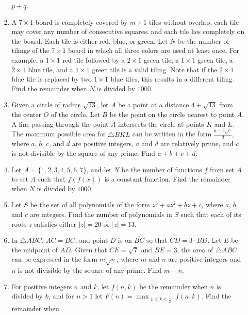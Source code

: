 \documentclass{article}
\begin{document}
\begin{enumerate}[label=\arabic*., itemsep=0.5em]
\(p+q\).\par \vspace{0.5em}\item A \(7\times 1\) board is completely covered by \(m\times 1\) tiles without overlap; each tile may cover any number of consecutive squares, and each tile lies completely on the board. Each tile is either red, blue, or green. Let \(N\) be the number of tilings of the \(7\times 1\) board in which all three colors are used at least once. For example, a \(1\times 1\) red tile followed by a \(2\times 1\) green tile, a \(1\times 1\) green tile, a \(2\times 1\) blue tile, and a \(1\times 1\) green tile is a valid tiling. Note that if the \(2\times 1\) blue tile is replaced by two \(1\times 1\) blue tiles, this results in a different tiling. Find the remainder when \(N\) is divided by \(1000\).\par \vspace{0.5em}\item Given a circle of radius \(\sqrt{13}\), let \(A\) be a point at a distance \(4 + \sqrt{13}\) from the center \(O\) of the circle. Let \(B\) be the point on the circle nearest to point \(A\). A line passing through the point \(A\) intersects the circle at points \(K\) and \(L\). The maximum possible area for \(\triangle BKL\) can be written in the form \(\frac{a - b\sqrt{c}}{d}\), where \(a\), \(b\), \(c\), and \(d\) are positive integers, \(a\) and \(d\) are relatively prime, and \(c\) is not divisible by the square of any prime. Find \(a+b+c+d\).\par \vspace{0.5em}\item Let \(A = \{1, 2, 3, 4, 5, 6, 7\}\), and let \(N\) be the number of functions \(f\) from set \(A\) to set \(A\) such that \(f(f(x))\) is a constant function. Find the remainder when \(N\) is divided by \(1000\).\par \vspace{0.5em}\item Let \(S\) be the set of all polynomials of the form \(z^3 + az^2 + bz + c\), where \(a\), \(b\), and \(c\) are integers. Find the number of polynomials in \(S\) such that each of its roots \(z\) satisfies either \(|z| = 20\) or \(|z| = 13\).\par \vspace{0.5em}\item In \(\triangle ABC\), \(AC = BC\), and point \(D\) is on \(\overline{BC}\) so that \(CD = 3\cdot BD\). Let \(E\) be the midpoint of \(\overline{AD}\). Given that \(CE = \sqrt{7}\) and \(BE = 3\), the area of \(\triangle ABC\) can be expressed in the form \(m\sqrt{n}\), where \(m\) and \(n\) are positive integers and \(n\) is not divisible by the square of any prime. Find \(m+n\).\par \vspace{0.5em}\item For positive integers \(n\) and \(k\), let \(f(n, k)\) be the remainder when \(n\) is divided by \(k\), and for \(n > 1\) let \(F(n) = \max_{\substack{1\le k\le \frac{n}{2}}} f(n, k)\). Find the remainder when 
\end{enumerate}
\end{document}
